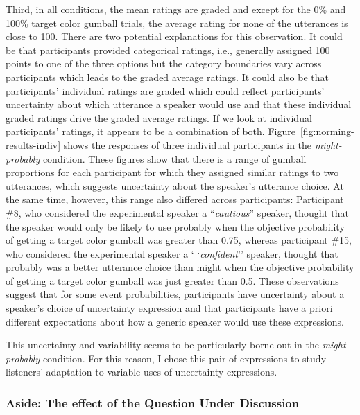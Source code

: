 Third, in all conditions, the mean ratings are graded and except for the 0\% and 100\% target color gumball trials, the average rating for none of the
utterances is close to 100. There are two potential explanations for this observation. It could be that participants provided categorical ratings, i.e.,
generally assigned 100 points to one of the three options but the category boundaries vary across participants which leads to the graded average ratings.
It could also be that participants' individual ratings are graded which could reflect participants' uncertainty about which utterance a speaker would use 
and that these individual graded ratings drive the  graded average ratings. If we look at individual participants' ratings, it appears to be a combination of both.
Figure~\ref{fig:norming-results-indiv} shows the responses of three individual participants in the \emph{might-probably} condition. These figures show that there 
is a range of gumball proportions for each participant for which they assigned similar ratings to two utterances, which suggests uncertainty about the speaker's 
utterance choice. At the same time, however, this range also differed across participants: Participant \#8, who considered the experimental speaker a 
``\textit{cautious}'' speaker, thought that the speaker would only be likely to use {\sc probably} 
when the objective probability of getting a target color gumball was greater than 0.75, whereas participant \#15, who considered the experimental speaker a `
`\textit{confident}'' speaker, thought that  {\sc probably} was a better utterance choice than {\sc might} 
when the objective probability of getting a target color gumball was just greater than 0.5. These observations suggest that for some event probabilities, participants have uncertainty  about a 
speaker's choice of uncertainty expression and that participants have a priori different expectations about how a generic speaker would use these expressions.

This uncertainty and variability seems to be particularly borne out in the \emph{might-probably} condition. For this reason, I chose this pair of expressions
to study listeners' adaptation to variable uses of uncertainty expressions.

\subsubsection{Aside: The effect of the Question Under Discussion}


